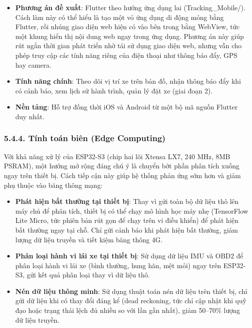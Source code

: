 \documentclass[a4paper]{extarticle}
\providecommand{\tightlist}{%
  \setlength{\itemsep}{0pt}\setlength{\parskip}{0pt}}
\begin{document}
\begin{itemize}
\tightlist
\item
  \textbf{Phương án đề xuất}: Flutter theo hướng ứng dụng lai
  (Tracking\_Mobile/). Cách làm này có thể hiểu là tạo một vỏ ứng dụng
  di động mỏng bằng Flutter, rồi nhúng giao diện web hiện có vào bên
  trong bằng WebView, tức một khung hiển thị nội dung web ngay trong ứng
  dụng. Phương án này giúp rút ngắn thời gian phát triển
  nhờ tái sử dụng giao diện web, nhưng vẫn cho phép truy cập các tính
  năng riêng của điện thoại như thông báo đẩy, GPS hay camera.
\item
\textbf{Tính năng chính}: Theo dõi vị trí xe trên bản đồ, nhận thông báo đẩy
khi có cảnh báo, xem lịch sử hành trình, quản lý đặt xe
  (giai đoạn 2).
\item
  \textbf{Nền tảng}: Hỗ trợ đồng thời iOS và Android từ một bộ mã nguồn
  Flutter duy nhất.
\end{itemize}

\subsubsection{5.4.4. Tính toán biên (Edge
Computing)}\label{544-tuxednh-touxe1n-biuxean-edge-computing}

Với khả năng xử lý của ESP32-S3 (chip hai lõi Xtensa LX7, 240 MHz, 8MB
PSRAM), một hướng mở rộng đáng chú ý là chuyển bớt phần phân tích xuống
ngay trên thiết bị. Cách tiếp cận này giúp hệ thống phản ứng sớm hơn và
giảm phụ thuộc vào băng thông mạng:

\begin{itemize}
\tightlist
\item
  \textbf{Phát hiện bất thường tại thiết bị}: Thay vì gửi toàn bộ dữ
  liệu thô lên máy chủ để phân tích, thiết bị có thể chạy mô hình học máy nhẹ
  (TensorFlow Lite Micro, tức phiên bản rút gọn để chạy trên vi điều
  khiển) để phát hiện bất thường ngay tại chỗ. Chỉ gửi
  cảnh báo khi phát hiện bất thường, giảm lượng dữ liệu truyền và tiết
  kiệm băng thông 4G.
\item
  \textbf{Phân loại hành vi lái xe tại thiết bị}: Sử dụng dữ liệu IMU và
  OBD2 để phân loại hành vi lái xe (bình thường, hung hãn, mệt mỏi) ngay
  trên ESP32-S3, gửi kết quả phân loại thay vì dữ liệu thô.
\item
  \textbf{Nén dữ liệu thông minh}: Sử dụng thuật toán nén dữ liệu trên
  thiết bị, chỉ gửi dữ liệu khi có thay đổi đáng kể (dead reckoning, tức
  chỉ cập nhật khi quỹ đạo hoặc trạng thái lệch đủ nhiều so với lần gần
  nhất),
  giảm 50--70\% lượng dữ liệu truyền.
\end{itemize}
\end{document}
